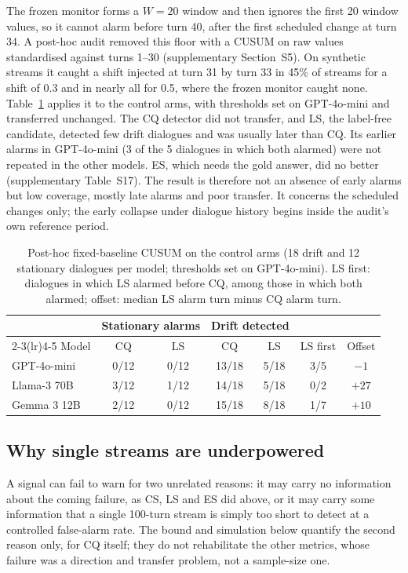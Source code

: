 The frozen monitor forms a $W=20$ window and then ignores the first 20 window
values, so it cannot alarm before turn 40, after the first scheduled change at
turn 34. A post-hoc audit removed this floor with a CUSUM on raw values
standardised against turns 1--30 (supplementary Section~S5). On synthetic
streams it caught a shift injected at turn 31 by turn 33 in 45\% of streams for
a shift of 0.3 and in nearly all for 0.5, where the frozen monitor caught none.
Table~\ref{tab:audit} applies it to the control arms, with thresholds set on
GPT-4o-mini and transferred unchanged. The CQ detector did not transfer, and
LS, the label-free candidate, detected few drift dialogues and was usually
later than CQ. Its earlier alarms in GPT-4o-mini (3 of the 5 dialogues in which
both alarmed) were not repeated in the other models. ES, which needs the gold
answer, did no better (supplementary Table~S17). The result is therefore not
an absence of early alarms but low coverage, mostly late alarms and poor
transfer. It concerns the scheduled changes only; the early collapse under
dialogue history begins inside the audit's own reference period.

\begin{table}[!htbp]
\centering
\caption{Post-hoc fixed-baseline CUSUM on the control arms (18 drift and 12
stationary dialogues per model; thresholds set on GPT-4o-mini). LS first:
dialogues in which LS alarmed before CQ, among those in which both alarmed;
offset: median LS alarm turn minus CQ alarm turn.}
\label{tab:audit}
\small
\begin{tabular}{lcccccc}
\toprule
 & \multicolumn{2}{c}{Stationary alarms} & \multicolumn{2}{c}{Drift detected} & & \\
\cmidrule(lr){2-3}\cmidrule(lr){4-5}
Model & CQ & LS & CQ & LS & LS first & Offset\\
\midrule
GPT-4o-mini & 0/12 & 0/12 & 13/18 & 5/18 & 3/5 & $-1$\\
Llama-3 70B & 3/12 & 1/12 & 14/18 & 5/18 & 0/2 & $+27$\\
Gemma 3 12B & 2/12 & 0/12 & 15/18 & 8/18 & 1/7 & $+10$\\
\bottomrule
\end{tabular}
\end{table}

\subsection{Why single streams are underpowered}

A signal can fail to warn for two unrelated reasons: it may carry no
information about the coming failure, as CS, LS and ES did above, or it may
carry some information that a single 100-turn stream is simply too short to
detect at a controlled false-alarm rate. The bound and simulation below
quantify the second reason only, for CQ itself; they do not rehabilitate the
other metrics, whose failure was a direction and transfer problem, not a
sample-size one.

